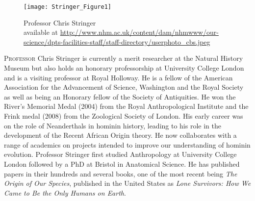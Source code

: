 \def\IJSRAidentifier{\currfilebase} %
\def\shorttitle{Interview: Professor Chris Stringer}
\def\maintitle{Interview with Professor Chris Stringer, Ph.D.}
\def\cmail{hannah.ryan@arch.ox.ac.uk}
\def\authorone{Hannah F. Ryan}
\def\bioone{PhD Student at the Research Laboratory in Archaeology and History of Art, University of Oxford, UK.}
\def\affilone{Department of Archaeology and History of Art, \\ University of Oxford, UK}


%
\IJSRAopening
\begin{figure}[!b]
	\texttt{[image: Stringer\_Figure1]}
	\caption{Professor Chris Stringer
	{\normalfont\scriptsize\\ available at \url{http://www.nhm.ac.uk/content/dam/nhmwww/our-science/dpts-facilities-staff/staff-directory/userphoto_cbs.jpeg}
                  }}
	\label{fig:Stringer_Figure1}
\end{figure}%
\lettrine{P}{rofessor} Chris Stringer is currently a merit researcher at the Natural History Museum but also holds
an honorary professorship at University College London and is a visiting professor at Royal Holloway.
He is a fellow of the American Association for the Advancement of Science, Washington and the Royal Society as well as
being an Honorary fellow of the Society of Antiquities. 
He won the River’s Memorial Medal (2004) from the Royal Anthropological Institute and the Frink medal (2008) from
the Zoological Society of London. His early career was on the role of Neanderthals in hominin history,
leading to his role in the development of the Recent African Origin theory.
He now collaborates with a range of academics on projects intended to improve our understanding of hominin evolution.
Professor Stringer first studied Anthropology at University College London followed by a PhD at Bristol in Anatomical Science.
He has published papers in their hundreds and several books, one of the most recent being \emph{The Origin of Our Species},
published in the United States as \emph{Lone Survivors: How We Came to Be the Only Humans on Earth}.



